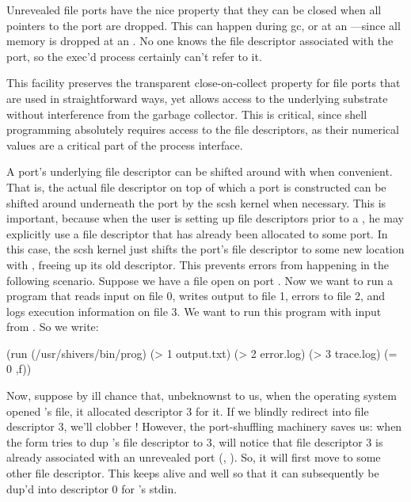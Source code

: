 Unrevealed file ports have the nice property that they can be closed when all
pointers to the port are dropped. This can happen during gc, or at an
---since all memory is dropped at an .  No one knows the
file descriptor associated with the port, so the exec'd process certainly
can't refer to it.

This facility preserves the transparent close-on-collect property
for file ports that are used in straightforward ways, yet allows
access to the underlying {\Unix} substrate without interference from
the garbage collector. This is critical, since shell programming
absolutely requires access to the {\Unix} file descriptors, as their
numerical values are a critical part of the process interface.

A port's underlying file descriptor can be shifted around with 
when convenient. That is, the actual file descriptor on top of which a port is
constructed can be shifted around underneath the port by the scsh kernel when
necessary.  This is important, because when the user is setting up file
descriptors prior to a , he may explicitly use a file descriptor
that has already been allocated to some port. In this case, the scsh kernel
just shifts the port's file descriptor to some new location with ,
freeing up its old descriptor.  This prevents errors from happening in the
following scenario.  Suppose we have a file open on port .  Now we want
to run a program that reads input on file 0, writes output to file 1, errors
to file 2, and logs execution information on file 3. We want to run this
program with input from . 
So we write:
%
\begin{code}
(run (/usr/shivers/bin/prog)
     (> 1 output.txt)
     (> 2 error.log)
     (> 3 trace.log)
     (= 0 ,f))\end{code}
%
Now, suppose by ill chance that, unbeknownst to us, when the operating system
opened 's file, it allocated descriptor 3 for it. If we blindly redirect
 into file descriptor 3, we'll clobber ! However, the
port-shuffling machinery saves us: when the  form tries to dup
's file descriptor to 3,  will notice that file
descriptor 3 is already associated with an unrevealed port (\ie, ). So,
it will first move  to some other file descriptor. This keeps 
alive and well so that it can subsequently be dup'd into descriptor 0 for
's stdin.

